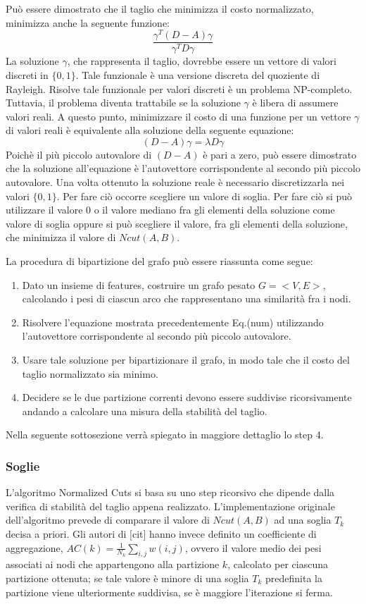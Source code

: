 Può essere dimostrato che il taglio che minimizza il costo normalizzato, minimizza anche la seguente funzione: $$ \frac{\gamma^{T}(D-A)\gamma}{\gamma^{T}D\gamma}$$
La soluzione $\gamma$, che rappresenta il taglio, dovrebbe essere un vettore di valori discreti in $\lbrace 0,1 \rbrace$. Tale funzionale è una versione discreta del quoziente di Rayleigh. Risolve tale funzionale per valori discreti è un problema NP-completo. Tuttavia, il problema diventa trattabile se la soluzione $\gamma$ è libera di assumere valori reali. A questo punto, minimizzare il costo di una funzione per un vettore $\gamma$ di valori reali è equivalente alla soluzione della seguente equazione: $$ (D-A) \gamma = \lambda D \gamma $$
Poichè il più piccolo autovalore di $(D-A)$ è pari a zero, può essere dimostrato che la soluzione all'equazione è l'autovettore corrispondente al secondo più piccolo autovalore.
Una volta ottenuto la soluzione reale è necessario discretizzarla nei valori $\lbrace 0,1 \rbrace$. Per fare ciò occorre scegliere un valore di soglia. Per fare ciò si può utilizzare il valore 0 o il valore mediano fra gli elementi della soluzione come valore di soglia oppure si può scegliere il valore, fra gli elementi della soluzione, che minimizza il valore di $Ncut(A,B)$.

La procedura di bipartizione del grafo può essere riassunta come segue:
\begin{enumerate}
\item Dato un insieme di features, costruire un grafo pesato $G = <V,E>$, calcolando i pesi di ciascun arco che rappresentano una similarità fra i nodi.
\item Risolvere l'equazione mostrata precedentemente Eq.(num) utilizzando l'autovettore corrispondente al secondo più piccolo autovalore.
\item Usare tale soluzione per bipartizionare il grafo, in modo tale che il costo del taglio normalizzato sia minimo.
\item Decidere se le due partizione correnti devono essere suddivise ricorsivamente andando a calcolare una misura della stabilità del taglio.
\end{enumerate}

Nella seguente sottosezione verrà spiegato in maggiore dettaglio lo step 4.

\subsubsection{Soglie}

L'algoritmo Normalized Cuts si basa su uno step ricorsivo che dipende dalla verifica di stabilità del taglio appena realizzato. L'implementazione originale dell'algoritmo prevede di comparare il valore di $Ncut(A,B)$ ad una soglia $T_{k}$ decisa a priori. Gli autori di [cit] hanno invece definito un coefficiente di aggregazione, $AC(k) = \frac{1}{N_{k}} \sum_{i,j} w(i,j)$, ovvero il valore medio dei pesi associati ai nodi che appartengono alla partizione $k$, calcolato per ciascuna partizione ottenuta; se tale valore è minore di una soglia $T_{k}$ predefinita la partizione viene ulteriormente suddivisa, se è maggiore l'iterazione si ferma.

